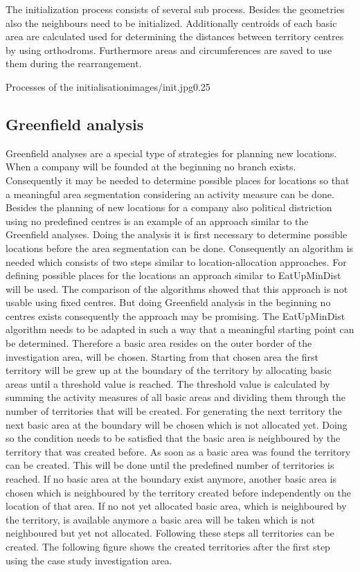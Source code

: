 The initialization process consists of several sub process. Besides the geometries also the neighbours need to be initialized. Additionally centroids of each basic area are calculated used for determining the distances between territory centres by using orthodroms. Furthermore areas and circumferences are saved to use them during the rearrangement.

\begin{figurevarSize}{Processes of the initialisation}{images/init.jpg}{0.25}\end{figurevarSize}

\subsection{Greenfield  analysis}

Greenfield analyses are a special type of strategies for planning new locations. When a company will be founded at the beginning no branch exists. Consequently it may be needed to determine possible places for locations so that a meaningful area segmentation considering an activity measure can be done. Besides the planning of new locations for a company also political distriction using no predefined centres is an example of an approach similar to the Greenfield analyses. Doing the analysis it is first necessary to determine possible locations before the area segmentation can be done. Consequently an algorithm is needed which consists of two steps similar to location-allocation approaches. For defining possible places for the locations an approach similar to EatUpMinDist will be used. The comparison of the algorithms showed that this approach is not usable using fixed centres. But doing Greenfield analysis in the beginning no centres exists consequently the approach may be promising. The EatUpMinDist algorithm needs to be adapted in such a way that a meaningful starting point can be determined. Therefore a basic area resides on the outer border of the investigation area, will be chosen. Starting from that chosen area the first territory will be grew up at the boundary of the territory by allocating basic areas until a threshold value is reached. The threshold value is calculated by summing the activity measures of all basic areas and dividing them through the number of territories that will be created. For generating the next territory the next basic area at the boundary will be chosen which is not allocated yet. Doing so the condition needs to be satisfied that the basic area is neighboured by the territory that was created before. As soon as a basic area was found the territory can be created. This will be done until the predefined number of territories is reached. If no basic area at the boundary exist anymore, another basic area is chosen which is neighboured by the territory created before independently on the location of that area. If no not yet allocated basic area, which is neighboured by the territory, is available anymore a basic area will be taken which is not neighboured but yet not allocated. Following these steps all territories can be created. The following figure shows the created territories after the first step using the case study investigation area.

